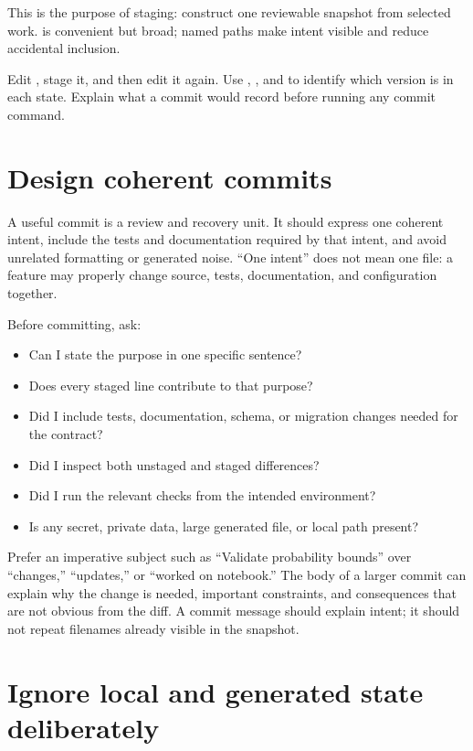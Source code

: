 This is the purpose of staging: construct one reviewable snapshot from selected
work.  is convenient but broad; named paths make intent visible
and reduce accidental inclusion.

\begin{checkpointbox}
Edit , stage it, and then edit it again. Use ,
, and  to identify which version is in
each state. Explain what a commit would record before running any commit command.
\end{checkpointbox}

\section{Design coherent commits}

A useful commit is a review and recovery unit. It should express one coherent
intent, include the tests and documentation required by that intent, and avoid
unrelated formatting or generated noise. ``One intent'' does not mean one file:
a feature may properly change source, tests, documentation, and configuration
together.

Before committing, ask:

\begin{itemize}
  \item Can I state the purpose in one specific sentence?
  \item Does every staged line contribute to that purpose?
  \item Did I include tests, documentation, schema, or migration changes needed
  for the contract?
  \item Did I inspect both unstaged and staged differences?
  \item Did I run the relevant checks from the intended environment?
  \item Is any secret, private data, large generated file, or local path present?
\end{itemize}

Prefer an imperative subject such as ``Validate probability bounds'' over
``changes,'' ``updates,'' or ``worked on notebook.'' The body of a larger commit
can explain why the change is needed, important constraints, and consequences
that are not obvious from the diff. A commit message should explain intent; it
should not repeat filenames already visible in the snapshot.

\section{Ignore local and generated state deliberately}

